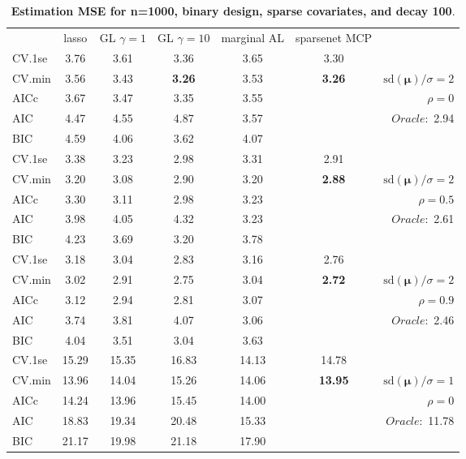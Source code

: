 \clearpage
\begin{table}\vspace{-.5cm}
\caption[l]{ { \bf Estimation MSE for n=1000, binary design, 
sparse covariates, and  decay  100}.}
\vspace{-.5cm}
\footnotesize{}
\begin{center}
\begin{tabular}{l*{5}{c}|r}
& lasso & GL $\gamma=1$ & GL $\gamma=10$ & marginal AL & sparsenet MCP  & \\
 \cline{1-7}
CV.1se & 3.76 & 3.61 & 3.36 & 3.65 & 3.30 & \\
CV.min & 3.56 & 3.43 & {\bf 3.26} & 3.53 & {\bf 3.26} &  $\mathrm{sd}(\mathbf{\mu})/\sigma=2$ \\
AICc & 3.67 & 3.47 & 3.35 & 3.55 & & $\rho=0$ \\
AIC & 4.47 & 4.55 & 4.87 & 3.57 & &  \multirow{2}{*}{$Oracle: $ 2.94} \\
BIC & 4.59 & 4.06 & 3.62 & 4.07 & &  \\
 \hline 
CV.1se & 3.38 & 3.23 & 2.98 & 3.31 & 2.91 & \\
CV.min & 3.20 & 3.08 & 2.90 & 3.20 & {\bf 2.88} &  $\mathrm{sd}(\mathbf{\mu})/\sigma=2$ \\
AICc & 3.30 & 3.11 & 2.98 & 3.23 & & $\rho=0.5$ \\
AIC & 3.98 & 4.05 & 4.32 & 3.23 & &  \multirow{2}{*}{$Oracle: $ 2.61} \\
BIC & 4.23 & 3.69 & 3.20 & 3.78 & &  \\
 \hline 
CV.1se & 3.18 & 3.04 & 2.83 & 3.16 & 2.76 & \\
CV.min & 3.02 & 2.91 & 2.75 & 3.04 & {\bf 2.72} &  $\mathrm{sd}(\mathbf{\mu})/\sigma=2$ \\
AICc & 3.12 & 2.94 & 2.81 & 3.07 & & $\rho=0.9$ \\
AIC & 3.74 & 3.81 & 4.07 & 3.06 & &  \multirow{2}{*}{$Oracle: $ 2.46} \\
BIC & 4.04 & 3.51 & 3.04 & 3.63 & &  \\
 \hline 
CV.1se & 15.29 & 15.35 & 16.83 & 14.13 & 14.78 & \\
CV.min & 13.96 & 14.04 & 15.26 & 14.06 & {\bf 13.95} &  $\mathrm{sd}(\mathbf{\mu})/\sigma=1$ \\
AICc & 14.24 & 13.96 & 15.45 & 14.00 & & $\rho=0$ \\
AIC & 18.83 & 19.34 & 20.48 & 15.33 & &  \multirow{2}{*}{$Oracle: $ 11.78} \\
BIC & 21.17 & 19.98 & 21.18 & 17.90 & &  \\

\end{tabular}
\end{center}
\end{table}
